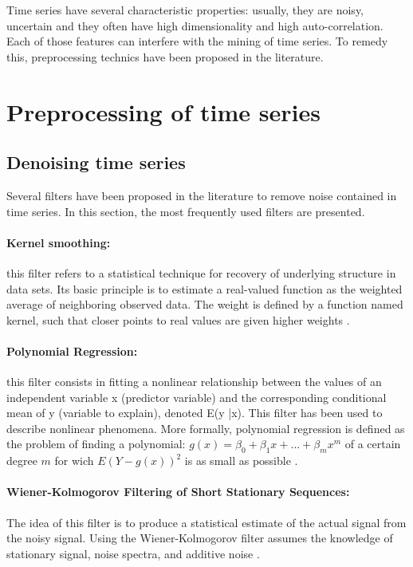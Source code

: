 Time series have several characteristic properties: usually, they are noisy, uncertain and  
they often have high dimensionality and high auto-correlation. Each of those features can interfere with the mining of time series.  To remedy this, preprocessing technics have been proposed in the literature.
\section{Preprocessing of time series}


\subsection{Denoising time series}
Several filters have been proposed in the literature to remove noise contained in time series. In this section, the most  frequently used filters are presented.
\paragraph{Kernel smoothing:} this filter refers to a statistical technique for recovery of underlying structure in data sets. Its basic principle is to estimate a real-valued function as the weighted average of neighboring observed data. The weight is defined by a function named kernel, such that closer points to real values are given higher weights \cite{wand1994kernel}.

\paragraph{Polynomial Regression:} this filter consists in fitting a nonlinear relationship between the values of an independent variable x (predictor variable)  and the corresponding conditional mean of y (variable to explain), denoted E(y |x). This filter has been used to describe nonlinear phenomena. More formally, polynomial regression is defined as the problem of finding a polynomial:  $g(x)=\beta_{0}+\beta_{1}x+...+\beta_{m}x^{m}$ of a certain degree $m$ for wich $E(Y-g(x))^{2}$ is as small as possible \cite{kendall1961advanced}.

\paragraph{Wiener-Kolmogorov Filtering of Short Stationary Sequences:}  
The idea of this filter is to produce a statistical estimate of the actual signal from the noisy signal. Using the Wiener-Kolmogorov filter assumes the knowledge of stationary signal, noise spectra, and additive noise \cite{pollock2007wiener}.

